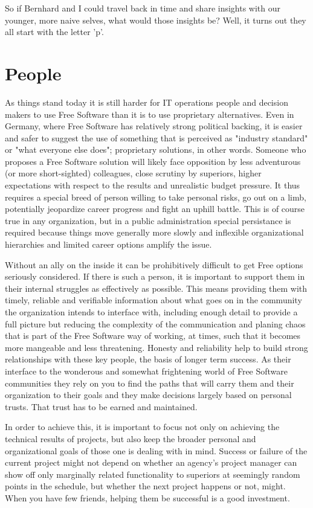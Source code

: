 So if Bernhard and I could travel back in time and share insights with our younger, more
naive selves, what would those insights be? Well, it turns out they all start with the
letter 'p'.

\section*{People}

As things stand today it is still harder for IT operations people and decision
makers to use Free Software than it is to use proprietary alternatives. Even in
Germany, where Free Software has relatively strong political backing, it is
easier and safer to suggest the use of something that is perceived as "industry
standard" or "what everyone else does"; proprietary solutions, in other words.
Someone who proposes a Free Software solution will likely face opposition by
less adventurous (or more short-sighted) colleagues, close scrutiny by
superiors, higher expectations with respect to the results and unrealistic
budget pressure. It thus requires a special breed of person willing to take
personal risks, go out on a limb, potentially jeopardize career progress and
fight an uphill battle. This is of course true in any organization, but in a
public administration special persistance is required because things move
generally more slowly and inflexible organizational hierarchies and limited
career options amplify the issue.

Without an ally on the inside it can be prohibitively difficult to get
Free options seriously considered. If there is such a person, it is important
to support them in their internal struggles as effectively as possible. This
means providing them with timely, reliable and verifiable information about
what goes on in the community the organization intends to interface with,
including enough detail to provide a full picture but reducing the
complexity of the communication and planing chaos that is part of the Free
Software way of working, at times, such that it becomes more mangeable and
less threatening. Honesty and reliability help to build strong
relationships with these key people, the basis of longer term success. As
their interface to the wonderous and somewhat frightening world of Free
Software communities they rely on you to find the paths that will carry
them and their organization to their goals and they make decisions largely
based on personal trusts. That trust has to be earned and maintained.

In order to achieve this, it is important to focus not only on achieving
the technical results of projects, but also keep the broader personal and organizational
goals of those one is dealing with in mind. Success or failure of the current
project might not depend on whether an agency's project manager can show off
only marginally related functionality to superiors at seemingly random points
in the schedule, but whether the next project happens or not, might. When you have
few friends, helping them be successful is a good investment.

